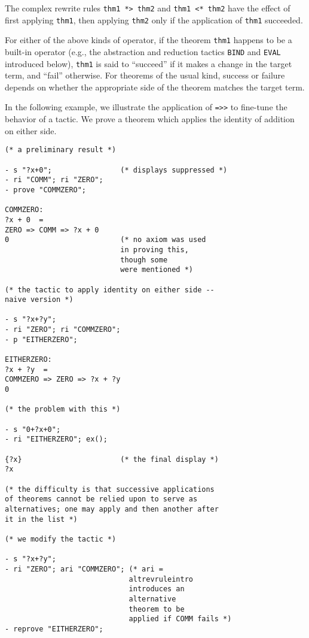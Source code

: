 \documentclass{kluwer}
\begin{document}
\begin{article}
\begin{description}
The complex rewrite rules {\tt thm1 *> thm2} and {\tt thm1 <* thm2}
have the effect of first applying {\tt thm1}, then applying {\tt thm2}
only if the application of {\tt thm1} succeeded.

For either of the above kinds of operator, if the theorem {\tt thm1}
happens to be a built-in operator (e.g., the abstraction and reduction
tactics {\tt BIND} and {\tt EVAL} introduced below), {\tt thm1} is
said to ``succeed'' if it makes a change in the target term, and
``fail'' otherwise.  For theorems of the usual kind, success or
failure depends on whether the appropriate side of the theorem matches
the target term.

In the following example, we illustrate the application of {\tt =>>}
to fine-tune the behavior of a tactic.  We prove a theorem which
applies the identity of addition on either side.

\begin{verbatim}
(* a preliminary result *)

- s "?x+0";                (* displays suppressed *)
- ri "COMM"; ri "ZERO";
- prove "COMMZERO";

COMMZERO:  
?x + 0  =  
ZERO => COMM => ?x + 0
0                          (* no axiom was used 
                           in proving this, 
                           though some 
                           were mentioned *)

(* the tactic to apply identity on either side -- 
naive version *)

- s "?x+?y";
- ri "ZERO"; ri "COMMZERO"; 
- p "EITHERZERO";

EITHERZERO:  
?x + ?y  =  
COMMZERO => ZERO => ?x + ?y
0

(* the problem with this *)

- s "0+?x+0";
- ri "EITHERZERO"; ex();

{?x}                       (* the final display *)
?x

(* the difficulty is that successive applications 
of theorems cannot be relied upon to serve as 
alternatives; one may apply and then another after 
it in the list *)

(* we modify the tactic *)

- s "?x+?y";
- ri "ZERO"; ari "COMMZERO"; (* ari = 
                             altrevruleintro
                             introduces an 
                             alternative 
                             theorem to be
                             applied if COMM fails *)
- reprove "EITHERZERO";


\end{verbatim}
\end{description}
\end{article}
\end{document}
